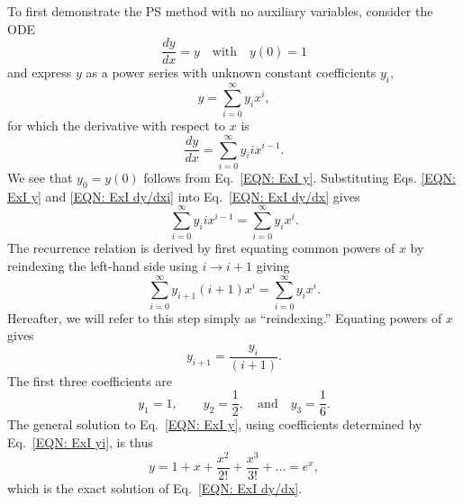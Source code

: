 \documentclass[draft]{agujournal2019}
\begin{document}
To first demonstrate the PS method with no auxiliary variables, consider the ODE
    \begin{equation}\label{EQN: ExI dy/dx}
        \frac{dy}{dx}=y\quad\mbox{with}\quad y(0) =1
    \end{equation}
and express $y$ as a power series with unknown constant coefficients $y_i$,
    \begin{equation}\label{EQN: ExI y}
            y=\sum_{i=0}^\infty y_ix^i,
    \end{equation}
for which the derivative with respect to $x$ is
    \begin{equation}\label{EQN: ExI dy/dxi}
        \frac{dy}{dx}=\sum_{i=0}^\infty y_iix^{i-1}.
    \end{equation}
We see that $y_0=y(0)$ follows from Eq.~\eqref{EQN: ExI y}. Substituting Eqs. \eqref{EQN: ExI y} and \eqref{EQN: ExI dy/dxi} into Eq.~\eqref{EQN: ExI dy/dx} gives
    \begin{equation*}
            \sum_{i=0}^\infty y_iix^{i-1}=\sum_{i=0}^\infty y_ix^i.
    \end{equation*}
The recurrence relation is derived by first equating common powers of $x$ by reindexing the left-hand side using $i \to i+1$ giving
    \begin{equation*}
        \sum_{i=0}^\infty y_{i+1}(i+1)x^{i}=\sum_{i=0}^\infty y_ix^i.
    \end{equation*}
Hereafter, we will refer to this step simply as ``reindexing.''  Equating powers of $x$ gives
    \begin{equation}\label{EQN: ExI yi}
        y_{i+1} = \frac{y_i}{(i+1)}.
    \end{equation}
The first three coefficients are
    \begin{equation*}
        y_1=1,\quad\quad y_2=\frac{1}{2},\quad\mbox{and}\quad y_3=\frac{1}{6}.
    \end{equation*}
The general solution to Eq.~\eqref{EQN: ExI y}, using coefficients determined by Eq.~\eqref{EQN: ExI yi}, is thus
    \begin{equation*}
        y=1+x+\frac{x^2}{2!}+\frac{x^3}{3!}+\dots=e^x,
    \end{equation*}
which is the exact solution of Eq.~\eqref{EQN: ExI dy/dx}.
\end{document}
